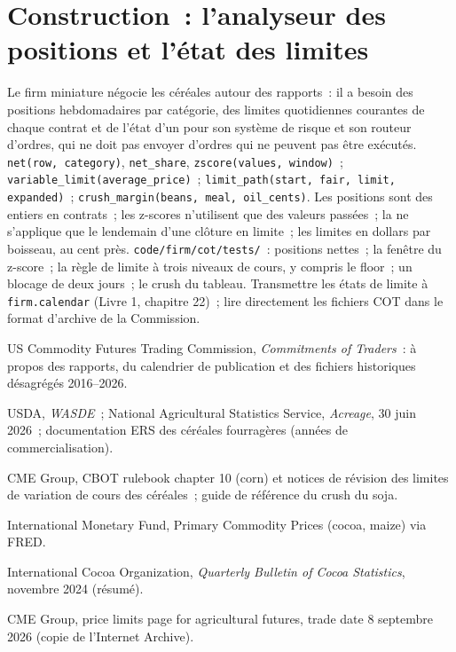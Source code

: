 \section{Construction~: l'analyseur des positions et l'état des limites}\label{bld:m3:agriculturals-and-softs:cot}

\begin{build}
 Le firm miniature négocie les céréales autour des rapports~: il a besoin des positions hebdomadaires
par catégorie, des limites quotidiennes courantes de chaque contrat et de l'état d'un  pour
son système de risque et son routeur d'ordres, qui ne doit pas envoyer d'ordres qui ne peuvent pas être exécutés.
 \texttt{net(row, category)}, \texttt{net\_share}, \texttt{zscore(values, window)}~;
\texttt{variable\_limit(average\_price)}~; \texttt{limit\_path(start, fair, limit, expanded)}~;
\texttt{crush\_margin(beans, meal, oil\_cents)}.
 Les positions sont des entiers en contrats~; les z-scores n'utilisent que des valeurs passées~; la  ne s'applique que le lendemain d'une clôture en limite~; les limites en dollars par boisseau, au cent près.
 \texttt{code/firm/cot/tests/}~: positions nettes~; la fenêtre du z-score~; la règle de
limite à trois niveaux de cours, y compris le floor~; un blocage de deux jours~; le crush du tableau.
 Transmettre les états de limite à \texttt{firm.calendar} (Livre 1, chapitre 22)~; lire
directement les fichiers COT dans le format d'archive de la Commission.
\end{build}

\begin{omsources}
\item US Commodity Futures Trading Commission, \emph{Commitments of Traders}~: à propos des rapports, du calendrier
de publication et des fichiers historiques désagrégés 2016--2026.
\item USDA, \emph{WASDE}~; National Agricultural Statistics Service, \emph{Acreage}, 30 juin 2026~; documentation ERS
des céréales fourragères (années de commercialisation).
\item CME Group, CBOT rulebook chapter 10 (corn) et notices de révision des limites de variation de cours des céréales~;
guide de référence du crush du soja.
\item International Monetary Fund, Primary Commodity Prices (cocoa, maize) via FRED.
\item International Cocoa Organization, \emph{Quarterly Bulletin of Cocoa Statistics}, novembre 2024 (résumé).
\item CME Group, price limits page for agricultural futures, trade date 8 septembre 2026 (copie de l'Internet Archive).
\end{omsources}

